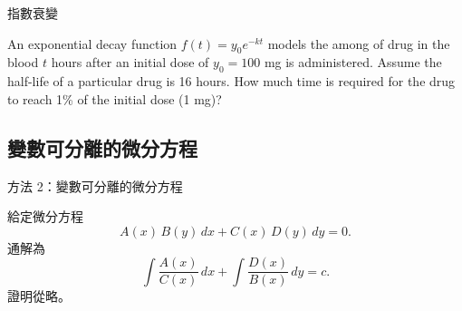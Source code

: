 \documentclass{beamer}
\newcommand  {\e}{\textup e}
\newcommand{\negskip}{\vskip -2em plus 3pt minus 3pt}
\theoremstyle{remark}
\begin{document}
\begin{CJK}{UTF8}{bsmi}
\begin{frame}{指數衰變}
  \begin{example}
    An exponential decay function $f(t) = y_0 e^{-kt}$ models the among of drug in the blood $t$ hours after an initial
    dose of $y_0 = 100$ mg is administered. Assume the half-life of a particular drug is 16 hours. How much time is
    required for the drug to reach 1\% of the initial dose (1 mg)?
  \end{example}
\end{frame}

\subsection[變數可分離]{變數可分離的微分方程}
\begin{frame}{方法 2：變數可分離的微分方程}
  \begin{theorem}
    給定微分方程
    \[A(x)\,B(y)\,dx + C(x)\,D(y)\,dy = 0.\]
    通解為
    \[\int \frac{A(x)}{C(x)}\,dx + \int \frac{D(x)}{B(x)}\,dy = c.\]
    證明從略。
  \end{theorem}
\end{frame}


\end{CJK}
\end{document}
